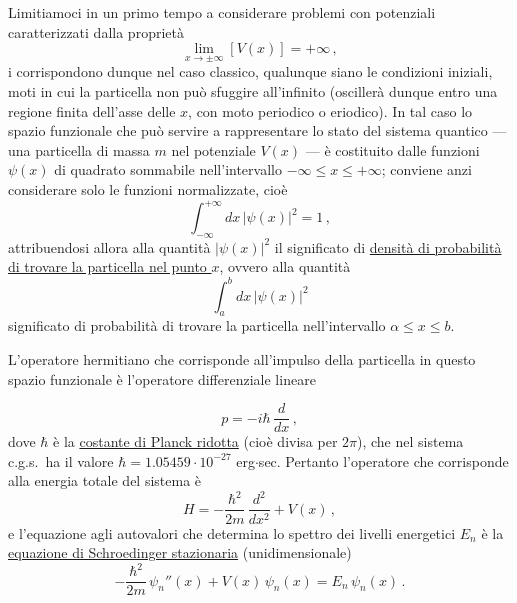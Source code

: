 \documentclass[11pt, a4paper]{book}
\numberwithin{equation}{section}
\begin{document}
Limitiamoci in un primo tempo a considerare problemi con potenziali caratterizzati dalla proprietà
\begin{equation}
\lim_{x \to \pm\infty} \left[V(x)\right] = +\infty \,, \tag{2}
\end{equation}
i corrispondono dunque nel caso classico, qualunque siano le condizioni
iniziali, moti in cui la particella non può sfuggire all'infinito (oscillerà
dunque entro una regione finita dell'asse delle $x$, con moto periodico o
eriodico). In tal caso lo spazio funzionale che può servire a rappresentare lo stato del sistema quantico --- una particella di massa $m$ nel potenziale $V(x)$ --- è costituito dalle funzioni $\psi(x)$ di quadrato sommabile nell'intervallo $-\infty \leq x \leq +\infty$; conviene anzi considerare solo le funzioni normalizzate, cioè
\begin{equation}
\int_{-\infty}^{+\infty} dx\, |\psi(x)|^2 = 1 \,, \tag{3}
\end{equation}
attribuendosi allora alla quantità $|\psi(x)|^2$ il significato di \uline{densità
di probabilità di trovare la particella nel punto $x$}, ovvero alla quantità
\[
\int_a^b dx\, |\psi(x)|^2
\]
significato di probabilità di trovare la particella nell'intervallo $\alpha \leq x \leq b$.

L'operatore hermitiano che corrisponde all'impulso della particella in
questo spazio funzionale è l'operatore differenziale lineare


\begin{equation}
p = -i\hbar\, \frac{d}{dx} \,, \tag{4}
\end{equation}
dove $\hbar$ è la \uline{costante di Planck ridotta} (cioè divisa per $2\pi$), che nel
sistema c.g.s.\ ha il valore $\hbar = 1.05459 \cdot 10^{-27}$ erg$\cdot$sec. Pertanto l'operatore che corrisponde alla energia totale del sistema è
\begin{equation}
H = -\frac{\hbar^2}{2m}\, \frac{d^2}{dx^2} + V(x) \,, \tag{5}
\end{equation}
e l'equazione agli autovalori che determina lo spettro dei livelli energetici
$E_n$ è la \uline{equazione di Schroedinger stazionaria} (unidimensionale)
\begin{equation}
-\frac{\hbar^2}{2m}\, \psi_n''(x) + V(x)\, \psi_n(x) = E_n\, \psi_n(x) \,. \tag{6}
\end{equation}
\end{document}
